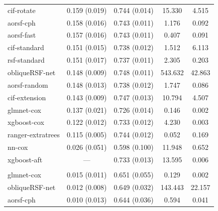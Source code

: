 \documentclass[12pt]{article}\usepackage[]{graphicx}\usepackage[]{xcolor}
\newenvironment{knitrout}{}{} %
\begin{document}
\begin{knitrout}
\begin{longtable}[t]{lcccc}
\hspace{1em}cif-rotate & 0.159 (0.019) & 0.744 (0.014) & 15.330 & 4.515\\
\hspace{1em}aorsf-cph & 0.158 (0.016) & 0.743 (0.011) & 1.176 & 0.092\\
\hspace{1em}aorsf-fast & 0.157 (0.016) & 0.743 (0.011) & 0.407 & 0.091\\
\hspace{1em}cif-standard & 0.151 (0.015) & 0.738 (0.012) & 1.512 & 6.113\\
\hspace{1em}rsf-standard & 0.151 (0.017) & 0.737 (0.011) & 2.305 & 0.203\\
\hspace{1em}obliqueRSF-net & 0.148 (0.009) & 0.748 (0.011) & 543.632 & 42.863\\
\hspace{1em}aorsf-random & 0.148 (0.013) & 0.738 (0.012) & 1.747 & 0.086\\
\hspace{1em}cif-extension & 0.143 (0.009) & 0.747 (0.013) & 10.794 & 4.507\\
\hspace{1em}glmnet-cox & 0.137 (0.021) & 0.726 (0.014) & 0.146 & 0.002\\
\hspace{1em}xgboost-cox & 0.122 (0.012) & 0.733 (0.012) & 4.230 & 0.003\\
\hspace{1em}ranger-extratrees & 0.115 (0.005) & 0.744 (0.012) & 0.052 & 0.169\\
\hspace{1em}nn-cox & 0.026 (0.051) & 0.598 (0.100) & 11.948 & 0.652\\
\hspace{1em}xgboost-aft & --- & 0.733 (0.013) & 13.595 & 0.006\\
\addlinespace[0.3em]
\multicolumn{5}{l}{\textit{\textbf{Monoclonal gammopathy; malignancy, n = 1384, p = 8}}}\\
\hline
\hspace{1em}glmnet-cox & 0.015 (0.011) & 0.651 (0.055) & 0.129 & 0.002\\
\hspace{1em}obliqueRSF-net & 0.012 (0.008) & 0.649 (0.032) & 143.443 & 22.157\\
\hspace{1em}aorsf-cph & 0.010 (0.013) & 0.644 (0.036) & 0.594 & 0.041\\

\end{longtable}
\end{knitrout}
\end{document}
